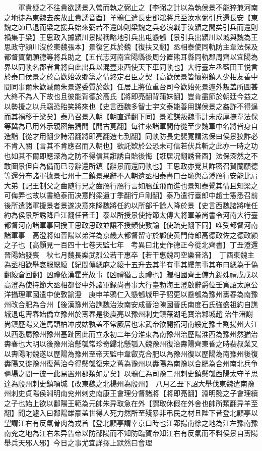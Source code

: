 　　軍貴疑之不往貴欲誘景入營而執之弼止之【李弼之計以為執侯景不能猝兼河南之地徒為東魏去疾故止貴誘音酉】羊鴉仁遣長史鄧鴻將兵至汝水弼引兵還長安【東魏之師已退而梁之援兵始來弼若不還師則梁魏之兵必浪戰于汝潁之間矣引兵而還則禍集于梁】王思政入據潁川景陽稱略地引兵出屯懸瓠【景引兵出潁川以城與魏為王思政守潁川沒於東魏張本】景復乞兵於魏【復扶又翻】丞相泰使同軌防主韋法保及都督賀蘭願德等將兵助之【五代志河南宜陽縣後周分置熊耳縣同軌郡周齊以宜陽為界以同軌名郡者言將自此出兵以混壹東西使天下車同軌也】大行臺左丞藍田王悦言於泰曰侯景之於高歡始敦鄉黨之情終定君臣之契【高歡侯景皆懷朔鎮人少相友善中間同事爾朱歡滅爾朱景遂委質於歡】任居上將位重台司今歡始死景遽外叛盖所圖甚大終不為人下故也且彼能背德於高氏【將即亮翻背蒲妹翻】豈肯盡節於朝廷今益之以勢援之以兵竊恐貽笑將來也【史言西魏多智士宇文泰能善用謀侯景之姦詐不得逞而其禍移于梁矣】泰乃召景入朝【朝直遥翻下同】景隂謀叛魏事計未成厚撫韋法保等冀為已用外示親密無猜閒【閒古莧翻】每往來諸軍間侍從至少魏軍中名將皆身自造詣【從才用翻少詩沼翻將即亮翻造七到翻】同軌防長史裴寛謂法保曰侯景狡詐必不肯入關【言其不肯應召而入朝也】欲託欵於公恐未可信若伏兵斬之此亦一時之功也如其不爾即應深為之防不得信其誑誘自貽後悔【誑居况翻誘音酉】法保深然之不敢圖景但自為備而已尋辭還所鎮【辭景而還同軌也】王思政亦覺其詐密召賀蘭願德等還分布諸軍據景七州十二鎮景果辭不入朝遺丞相泰書曰吾恥與高澄鴈行安能比肩大弟【記王制父之齒随行兄之齒鴈行鴈行言如鴈並飛而進也景知泰覺其情且知梁之可侮弄也故以書絶泰而决意附梁遺丁季翻行戶剛翻】泰乃遣行臺郎中趙士憲悉召前後所遣諸軍援景者景遂决意來降魏將任約以所部千餘人降於景【史言西魏諸將唯任約為侯景所誘降戶江翻任音壬】泰以所授景使持節太傅大將軍兼尚書令河南大行臺都督河南諸軍事回授王思政思政並讓不授頻使敦諭【使疏吏翻下同】唯受都督河南諸軍事　高澄將如晉陽以弟洋為京畿大都督留守於鄴使黄門侍郎高德政佐之德政顥之子也【高顥見一百四十七卷天監七年　考異曰北史作德正今從北齊書】丁丑澄還晉陽始發喪　秋七月魏長樂武烈公若干惠卒【若干惠魏司空樂音洛】　丁酉東魏主為丞相歡舉哀服緦縗【紀間傳緦麻之縗十五升去其半有事其縷無事其布曰緦為于偽翻縗倉回翻】凶禮依漢霍光故事【凶禮猶言喪禮也】贈相國齊王備九錫殊禮戊戌以高澄為使持節大丞相都督中外諸軍録尚書事大行臺勃海王澄啟辭爵位壬寅詔太原公洋攝理軍國遣中使敦諭澄　庚申羊鴉仁入懸瓠城甲子詔更以懸瓠為豫州夀春為南豫州改合肥為合州【後漢豫州治譙魏治汝南安成晉治陳國晉氏南度石氏強盛祖約自譙城退屯夀春始僑立豫州於夀春是後庾亮以豫州刺史鎮蕪湖毛寶治邾城趙治牛渚謝尚鎮歷陽又進馬頭柏冲戌姑孰盖不常厥居也宋武帝欲開拓河南綏定豫土割揚州大江以西悉屬豫州豫州基趾因此而立永初二年分淮東為南豫州治歷陽淮西為豫州然猶治夀春也大明以後豫州治懸瓠常珍奇歸北懸瓠入魏豫州復治夀陽齊東昏之時裴叔業又以夀陽附魏遂以歷陽為豫州至帝天監中韋叡克合肥以為豫州復以歷陽為南豫州後復夀陽又徙豫州復舊治今得懸瓠復宋之舊為豫州以夀陽為南豫以合肥為合州南北兵争疆場之間一彼一此易置州郡類如是矣】以鴉仁為司豫二州刺史鎮懸瓠西陽太守羊思達為殷州刺史鎮項城【改東魏之北楊州為殷州】　八月乙丑下詔大舉伐東魏遣南豫州刺史貞陽侯淵明南兖州刺史南康王會理分督諸將【將即亮翻】淵明懿之子會理續之子也始上欲以鄱陽王範為元帥朱异取急在外【謂取休假在外舍也帥所類翻异羊至翻】聞之遽入曰鄱陽雄豪盖世得人死力然所至殘暴非弔民之材且陛下昔登北顧亭以望謂江右有反氣骨肉為戎首【登北顧亭謂幸京口時也江郢揚南徐之地為江左豫南豫南兖之地為江右朱异告帝以防鄱陽而不知防臨賀帝知江右有反氣而不料侯景自夀陽舉兵天邪人邪】今日之事尤宜詳擇上默然曰會理